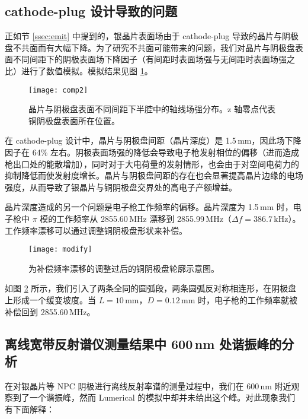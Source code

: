 \subsection{cathode-plug 设计导致的问题}
正如节 \ref{ssec:emit} 中提到的，银晶片表面场由于 cathode-plug 导致的晶片与阴极盘不共面而有大幅下降。为了研究不共面可能带来的问题，我们对晶片与阴极盘表面不同间距下的阴极表面场下降因子（有间距时表面场强与无间距时表面场强之比）进行了数值模拟。模拟结果见图 \ref{fig:comp}。
\begin{figure}[htbp]
\begin{center}
\texttt{[image: comp2]}
\caption{\label{fig:comp}
晶片与阴极盘表面不同间距下半腔中的轴线场强分布。z 轴零点代表铜阴极盘表面所在位置。}
\end{center}
\end{figure}

在 cathode-plug 设计中，晶片与阴极盘间距（晶片深度）是 1.5\,mm，因此场下降因子在 64\% 左右。阴极表面场强的降低会导致电子枪发射相位的偏移（进而造成枪出口处的能散增加），同时对于大电荷量的发射情形，也会由于对空间电荷力的抑制降低而使发射度增长。晶片与阴极盘间距的存在也会显著提高晶片边缘的电场强度，从而导致了银晶片与铜阴极盘交界处的高电子产额增益。

晶片深度造成的另一个问题是电子枪工作频率的偏移。晶片深度为 1.5\,mm 时，电子枪中 $\pi$ 模的工作频率从 2855.60\,MHz 漂移到 2855.99\,MHz（$\Delta f=386.7\,\text{kHz}$）。工作频率漂移可以通过调整铜阴极盘形状来补偿。
\begin{figure}[htbp]
\begin{center}
\texttt{[image: modify]}
\caption{\label{fig:mod} 为补偿频率漂移的调整过后的铜阴极盘轮廓示意图。}
\end{center}
\end{figure}
如图 \ref{fig:mod} 所示，我们引入了两条全同的圆弧段，两条圆弧反对称相连形，在阴极盘上形成一个缓变坡度。当 $L=10\,\text{mm}$，$D=0.12\,\text{mm}$ 时，电子枪的工作频率就被补偿回到 2855.60\,MHz。

\subsection{离线宽带反射谱仪测量结果中 600\,nm 处谐振峰的分析}
在对银晶片等 NPC 阴极进行离线反射率谱的测量过程中，我们在 600\,nm 附近观察到了一个谐振峰，然而 Lumerical 的模拟中却并未给出这个峰。对此现象我们有下面解释：

